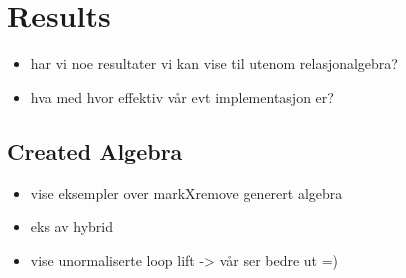 \chapter{Results}
\label{chapter:results}
\begin{itemize}
  \item har vi noe resultater vi kan vise til utenom relasjonalgebra?
  \item hva med hvor effektiv v\aa r evt implementasjon er?
\end{itemize}



\section{Created Algebra}
\begin{itemize}
  \item vise eksempler over markXremove generert algebra
  \item eks av hybrid
  \item vise unormaliserte loop lift -> v\aa r ser bedre ut =) 
\end{itemize}
